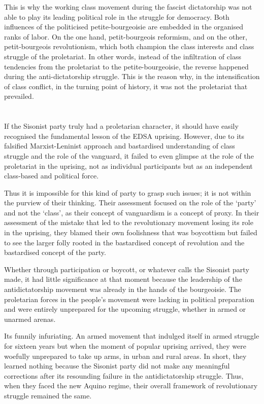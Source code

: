 This is why the working class movement during the fascist dictatorship 
was not able to play its leading political role in the struggle for democracy. 
Both influences of the politicised petite-bourgeoisie 
are embedded in the organised ranks of labor. 
On the one hand, petit-bourgeois reformism, 
and on the other, petit-bourgeois revolutionism, 
which both champion the class interests and class struggle of the proletariat. 
In other words, instead of the infiltration of class tendencies 
from the proletariat to the petite-bourgeoisie, 
the reverse happened during the anti-dictatorship struggle.
This is the reason why, 
in the intensification of class conflict, 
in the turning point of history, 
it was not the proletariat that prevailed.

\section{}
If the Sisonist party truly had a proletarian character, 
it should have easily recognised the fundamental lesson of the EDSA uprising. 
However, due to its falsified Marxist-Leninist approach 
and bastardised understanding of class struggle and the role of the vanguard, 
it failed to even glimpse 
at the role of the proletariat in the uprising, 
not as individual participants 
but as an independent class-based and political force.

Thus 
it is impossible for this kind of party 
to grasp such issues;
it is not within the purview of their thinking. 
Their assessment focused 
on the role of the `party' and not the `class', 
as their concept of vanguardism is a concept of proxy. 
In their assessment of the mistake that led 
to the revolutionary movement losing its role in the uprising, 
they blamed their own foolishness that was boycottism 
but failed to see the larger folly 
rooted in the bastardised concept of revolution 
and the bastardised concept of the party.

Whether through participation or boycott, 
or whatever calls the Sisonist party made, 
it had little significance at that moment 
because the leadership of the antidictatorship movement 
was already in the hands of the bourgeoisie. 
The proletarian forces in the people's movement 
were lacking in political preparation 
and were entirely unprepared for the upcoming struggle, 
whether in armed or unarmed arenas.

Its funnily infuriating. 
An armed movement that indulged itself 
in armed struggle for sixteen years 
but when the moment of popular uprising arrived, 
they were woefully unprepared to take up arms, 
in urban and rural areas. 
In short, 
they learned nothing 
because the Sisonist party did not make any meaningful corrections 
after its resounding failure in the antidictatorship struggle. 
Thus, when they faced the new Aquino regime, 
their overall framework of revolutionary struggle remained the same.

